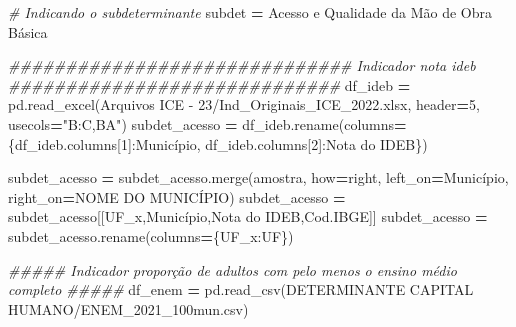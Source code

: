 \documentclass[
  12,
  dvipsnames]{article}
\newenvironment{Shaded}{\begin{snugshade}}{\end{snugshade}}
\newcommand{\CommentTok}[1]{\textcolor[rgb]{0.56,0.35,0.01}{\textit{#1}}}
\newcommand{\DecValTok}[1]{\textcolor[rgb]{0.00,0.00,0.81}{#1}}
\newcommand{\NormalTok}[1]{#1}
\newcommand{\OperatorTok}[1]{\textcolor[rgb]{0.81,0.36,0.00}{\textbf{#1}}}
\newcommand{\StringTok}[1]{\textcolor[rgb]{0.31,0.60,0.02}{#1}}
\begin{document}
\begin{Shaded}
\begin{Highlighting}[]
\CommentTok{\# Indicando o subdeterminante}
\NormalTok{subdet }\OperatorTok{=} \StringTok{\textquotesingle{}Acesso e Qualidade da Mão de Obra Básica\textquotesingle{}}

\CommentTok{\#\#\#\#\#\#\#\#\#\#\#\#\#\#\#\#\#\#\#\#\#\#\#\#\#\#\#\#\#\# Indicador nota ideb \#\#\#\#\#\#\#\#\#\#\#\#\#\#\#\#\#\#\#\#\#\#\#\#\#\#\#\#\#}
\NormalTok{df\_ideb }\OperatorTok{=}\NormalTok{ pd.read\_excel(}\StringTok{\textquotesingle{}Arquivos ICE {-} 23/Ind\_Originais\_ICE\_2022.xlsx\textquotesingle{}}\NormalTok{, header}\OperatorTok{=}\DecValTok{5}\NormalTok{,}
\NormalTok{                        usecols}\OperatorTok{=}\StringTok{"B:C,BA"}\NormalTok{)}
\NormalTok{subdet\_acesso }\OperatorTok{=}\NormalTok{ df\_ideb.rename(columns}\OperatorTok{=}\NormalTok{\{df\_ideb.columns[}\DecValTok{1}\NormalTok{]:}\StringTok{\textquotesingle{}Município\textquotesingle{}}\NormalTok{,}
\NormalTok{                                        df\_ideb.columns[}\DecValTok{2}\NormalTok{]:}\StringTok{\textquotesingle{}Nota do IDEB\textquotesingle{}}\NormalTok{\})}

\NormalTok{subdet\_acesso }\OperatorTok{=}\NormalTok{ subdet\_acesso.merge(amostra, how}\OperatorTok{=}\StringTok{\textquotesingle{}right\textquotesingle{}}\NormalTok{, left\_on}\OperatorTok{=}\StringTok{\textquotesingle{}Município\textquotesingle{}}\NormalTok{,}
\NormalTok{                                    right\_on}\OperatorTok{=}\StringTok{\textquotesingle{}NOME DO MUNICÍPIO\textquotesingle{}}\NormalTok{)}
\NormalTok{subdet\_acesso }\OperatorTok{=}\NormalTok{ subdet\_acesso[[}\StringTok{\textquotesingle{}UF\_x\textquotesingle{}}\NormalTok{,}\StringTok{\textquotesingle{}Município\textquotesingle{}}\NormalTok{,}\StringTok{\textquotesingle{}Nota do IDEB\textquotesingle{}}\NormalTok{,}\StringTok{\textquotesingle{}Cod.IBGE\textquotesingle{}}\NormalTok{]]}
\NormalTok{subdet\_acesso }\OperatorTok{=}\NormalTok{ subdet\_acesso.rename(columns}\OperatorTok{=}\NormalTok{\{}\StringTok{\textquotesingle{}UF\_x\textquotesingle{}}\NormalTok{:}\StringTok{\textquotesingle{}UF\textquotesingle{}}\NormalTok{\})}

\CommentTok{\#\#\#\#\# Indicador proporção de adultos com pelo menos o ensino médio completo \#\#\#\#\#}
\NormalTok{df\_enem }\OperatorTok{=}\NormalTok{ pd.read\_csv(}\StringTok{\textquotesingle{}DETERMINANTE CAPITAL HUMANO/ENEM\_2021\_100mun.csv\textquotesingle{}}\NormalTok{)}
 

\end{Highlighting}
\end{Shaded}
\end{document}

